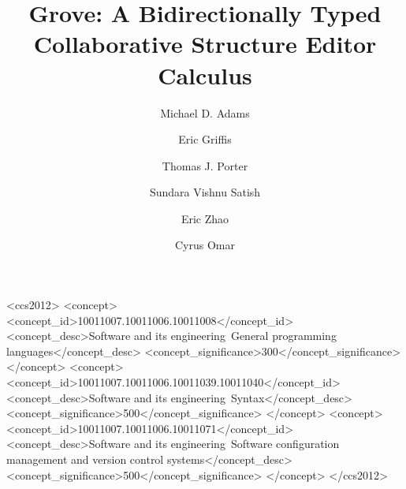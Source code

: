 \documentclass[acmsmall,dvipsnames,10pt]{config/acmart}\settopmatter{printfolios=true}
\begin{document}
\title{Grove: A Bidirectionally Typed Collaborative Structure Editor Calculus}

\author{Michael D. Adams}

\author{Eric Griffis}

\author{Thomas J. Porter}

\author{Sundara Vishnu Satish}

\author{Eric Zhao}

\author{Cyrus Omar}





\begin{CCSXML}
<ccs2012>
   <concept>
       <concept_id>10011007.10011006.10011008</concept_id>
       <concept_desc>Software and its engineering~General programming languages</concept_desc>
       <concept_significance>300</concept_significance>
       </concept>
   <concept>
       <concept_id>10011007.10011006.10011039.10011040</concept_id>
       <concept_desc>Software and its engineering~Syntax</concept_desc>
       <concept_significance>500</concept_significance>
       </concept>
   <concept>
       <concept_id>10011007.10011006.10011071</concept_id>
       <concept_desc>Software and its engineering~Software configuration management and version control systems</concept_desc>
       <concept_significance>500</concept_significance>
       </concept>
 </ccs2012>
\end{CCSXML}

\end{document}
